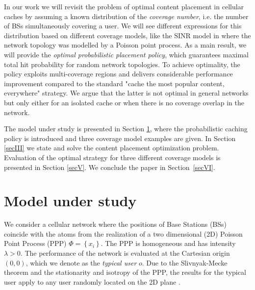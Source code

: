 \documentclass[conference,twocolum,final]{IEEEtran}
\begin{document}
In our work we will revisit the problem of optimal content placement in cellular caches by assuming a known distribution of the \textit{coverage number}, i.e. the number of BSs simultaneously covering a user. We will see different expressions for this distribution based on different coverage models, like the $\mathrm{SINR}$ model in \cite{KeelerBartek13} where the network topology was modelled by a Poisson point process. As a main result, we will provide the \textit{optimal probabilistic placement policy}, which guarantees maximal total hit probability for random network topologies. To achieve optimality, the policy exploits multi-coverage regions and delivers considerable performance improvement compared to the standard "cache the most popular content, everywhere" strategy. We argue that the latter is not optimal in general networks but only either for an isolated cache \cite{LeonardiCacheUni} or when there is no coverage overlap in the network. 

The model under study is presented in Section \ref{secII}, where the probabilistic caching policy is introduced and three coverage model examples are given. In Section \ref{secIII} we state and solve the content placement optimization problem. Evaluation of the optimal strategy for three different coverage models is presented in Section \ref{secV}. We conclude the paper in Section~\ref{secVI}.



\section{Model under study}
\label{secII}

We consider a cellular network where the positions of Base Stations (BSs) coincide with the atoms from the realization of a two dimensional (2D) Poisson Point Process (PPP) $\Phi=\left\{x_i\right\}$. The PPP is homogeneous and has intensity $\lambda>0$.
The performance of the network is evaluated at the Cartesian origin $\left(0,0\right)$, which we denote as the \textit{typical user} $o$. Due to the Slivnyak-Mecke theorem and the stationarity and isotropy of the PPP, the results for the typical user apply to any user randomly located on the 2D plane \cite{BacBlaVol1}. 
\end{document}
